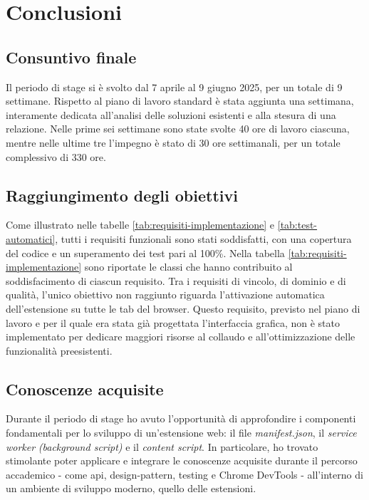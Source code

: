 \chapter{Conclusioni}
\label{cap:conclusioni}

\section{Consuntivo finale}

\par Il periodo di stage si è svolto dal 7 aprile al 9 giugno 2025, per un totale di 9 settimane. Rispetto al piano di lavoro standard è stata aggiunta una settimana, interamente dedicata all’analisi delle soluzioni esistenti e alla stesura di una relazione. Nelle prime sei settimane sono state svolte 40 ore di lavoro ciascuna, mentre nelle ultime tre l’impegno è stato di 30 ore settimanali, per un totale complessivo di 330 ore.

\section{Raggiungimento degli obiettivi}

\par Come illustrato nelle tabelle \ref{tab:requisiti-implementazione} e \ref{tab:test-automatici}, tutti i \gls{requisiti} funzionali sono stati soddisfatti, con una copertura del codice e un superamento dei test pari al 100\%. Nella tabella \ref{tab:requisiti-implementazione} sono riportate le classi che hanno contribuito al soddisfacimento di ciascun requisito. Tra i \gls{requisiti} di vincolo, di dominio e di qualità, l’unico obiettivo non raggiunto riguarda l’attivazione automatica dell’estensione su tutte le tab del browser. Questo requisito, previsto nel piano di lavoro e per il quale era stata già progettata l’interfaccia grafica, non è stato implementato per dedicare maggiori risorse al collaudo e all’ottimizzazione delle funzionalità preesistenti.

\section{Conoscenze acquisite}

\par Durante il periodo di stage ho avuto l’opportunità di approfondire i componenti fondamentali per lo sviluppo di un’estensione web: il file \textit{manifest.json}, il \textit{service worker} \textit{(background script)} e il \textit{content script}. In particolare, ho trovato stimolante poter applicare e integrare le conoscenze acquisite durante il percorso accademico - come \gls{api}, \gls{design-pattern}, testing e Chrome DevTools - all’interno di un ambiente di sviluppo moderno, quello delle estensioni.

